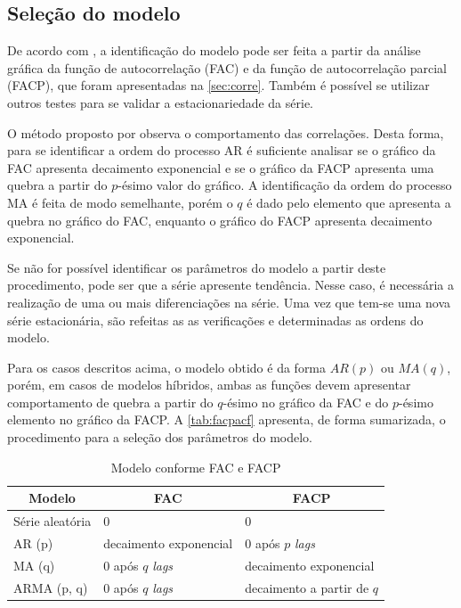 \documentclass[
    12pt,
    oneside,
    a4paper,
    english,
    brazil
]{abntex2}
\begin{document}
\subsection{Seleção do modelo}

De acordo  com ,  a identificação  do modelo  pode ser  feita a
partir da  análise gráfica  da função  de autocorrelação (FAC)  e da  função de
autocorrelação parcial (FACP), que  foram apresentadas  na \autoref{sec:corre}.
Também é possível se utilizar outros testes para se validar a
estacionariedade da série.

O método proposto por  observa o comportamento das correlações.
Desta forma, para se identificar a ordem do processo AR é suficiente  analisar se o gráfico
da FAC apresenta decaimento exponencial e se o gráfico da FACP apresenta uma quebra a partir do
$p$-ésimo valor do  gráfico. A identificação da ordem do processo MA é feita  de modo  semelhante,  porém o  $q$  é dado  pelo elemento  que apresenta  a quebra  no gráfico  do FAC,  enquanto o  gráfico do  FACP apresenta decaimento exponencial.

Se não for  possível identificar os parâmetros do modelo a partir  deste procedimento, pode ser
que a  série apresente  tendência. Nesse caso,  é necessária
a  realização  de  uma  ou  mais diferenciações na série. Uma vez que tem-se uma nova série estacionária, são refeitas as as verificações e determinadas as ordens  do modelo.


Para os casos descritos acima, o modelo obtido é da forma  $AR(p)$ ou $MA(q)$, porém,
em casos  de modelos híbridos,  ambas as funções devem apresentar  comportamento de
quebra  a  partir  do  $q$-ésimo  no gráfico da  FAC  e do $p$-ésimo elemento no gráfico da  FACP\@.  
A \autoref{tab:facpacf} apresenta, de forma sumarizada, o procedimento para a seleção  dos parâmetros do modelo.

\begin{table}[ht]
    \centering
    \caption{Modelo conforme FAC e FACP}\label{tab:facpacf}
    \begin{tabular}{l l l}
        \multicolumn{1}{c}{Modelo} & \multicolumn{1}{c}{FAC} & \multicolumn{1}{c}{FACP} \\
        \toprule
        Série aleatória  & 0                           & 0                        \\
        AR (p)           & decaimento exponencial      & 0 após $p$ \textit{lags} \\
        MA (q)           & 0 após $q$ \textit{lags}    & decaimento exponencial   \\
        ARMA (p, q)      & 0 após $q$ \textit{lags}    & decaimento a partir de $q$
    \end{tabular}
\end{table}
\end{document}

